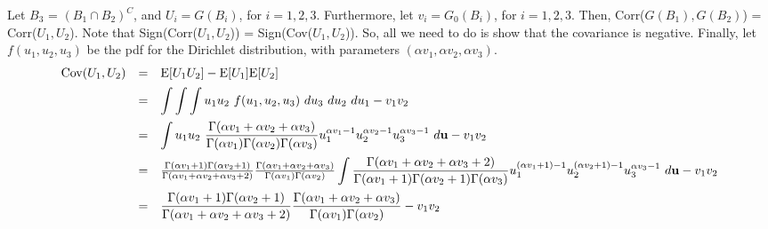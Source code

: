 \documentclass{article}
\def\ds{\displaystyle}
\begin{document}
\noindent
Let $B_3$ = $(B_1 \cap B_2)^C$, and $U_i = G(B_i)$, for $i=1,2,3$.
Furthermore, let $v_i = G_0(B_i)$, for $i=1,2,3$. Then, Corr($G(B_1),G(B_2)$) =
Corr($U_1,U_2$). Note that Sign(Corr($U_1,U_2$)) = Sign(Cov($U_1,U_2$)). So,
all we need to do is show that the covariance is negative. Finally, let
$f(u_1,u_2,u_3)$ be the pdf for the Dirichlet distribution, with parameters
$(\alpha v_1, \alpha v_2, \alpha v_3)$. \\
\[
  \begin{array}{rcl}
                            \vspace{.5em}
    \text{Cov}(U_1,U_2) &=& \text{E}[U_1 U_2] - \text{E}[U_1]\text{E}[U_2] \\
                            \vspace{.5em}
                        &=& \ds\int\int\int u_1u_2~f(u_1,u_2,u_3)~du_3~du_2~du_1 - v_1 v_2 \\
                            \vspace{.5em}
                        &=& \ds\int u_1u_2~
                            \frac{\Gamma(\alpha v_1 + \alpha v_2 + \alpha v_3)}
                            {\Gamma(\alpha v_1)\Gamma(\alpha v_2)\Gamma(\alpha v_3)}
                            u_1^{\alpha v_1 - 1} u_2^{\alpha v_2 - 1} u_3^{\alpha v_3 - 1}
                            ~d\mathbf u - v_1 v_2 \\
                            \vspace{.5em}
                        &=& \frac{\Gamma(\alpha v_1 +1)\Gamma(\alpha v_2 +1)}
                            {\Gamma(\alpha v_1 + \alpha v_2 + \alpha v_3 + 2)}
                            \frac {\Gamma(\alpha v_1 + \alpha v_2 + \alpha v_3)}
                            {\Gamma(\alpha v_1)\Gamma(\alpha v_2)}
                            \ds\int\frac{\Gamma(\alpha v_1 + \alpha v_2 + \alpha v_3 + 2)}
                            {\Gamma(\alpha v_1+1)\Gamma(\alpha v_2+1)\Gamma(\alpha v_3)}
                            u_1^{(\alpha v_1 + 1) - 1} u_2^{(\alpha v_2 + 1) - 1} u_3^{\alpha v_3 - 1}
                            ~d\mathbf u - v_1 v_2 \\
                            \vspace{.5em}
                        &=& \ds\frac{\Gamma(\alpha v_1 +1)\Gamma(\alpha v_2 +1)}
                            {\Gamma(\alpha v_1 + \alpha v_2 + \alpha v_3 + 2)}
                            \ds\frac {\Gamma(\alpha v_1 + \alpha v_2 + \alpha v_3)}
                            {\Gamma(\alpha v_1)\Gamma(\alpha v_2)} - v_1 v_2\\

\end{array}\]
\end{document}
